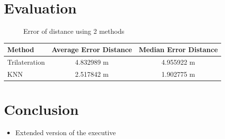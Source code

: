 \documentclass[12pt, conference]{IEEEtran}
\begin{document}
\section{Evaluation}
\begin{figure}[htbp]
  \centering
  \caption{Error of distance using 2 methods}
  \label{fig: Comparison}
\end{figure}

\begin{table}[htbp]
  \begin{tabular}{|l|c|c|}
  \hline
  Method        & Average Error Distance & Median Error Distance \\ \hline
  Trilateration & 4.832989 m             & 4.955922 m            \\ \hline
  KNN           & 2.517842 m             & 1.902775 m            \\ \hline
  \end{tabular}
\end{table}

\section{Conclusion}
\begin{itemize}
  \item Extended version of the executive 
\end{itemize}



\end{document}
